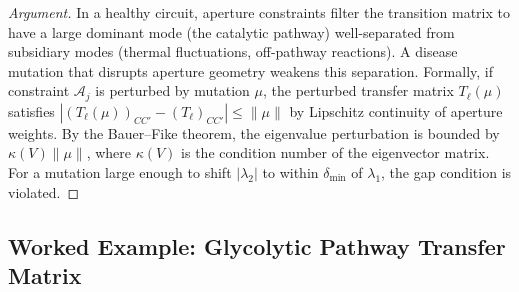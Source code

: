 \begin{proof}[Argument]
In a healthy circuit, aperture constraints filter the transition matrix to
have a large dominant mode (the catalytic pathway) well-separated from
subsidiary modes (thermal fluctuations, off-pathway reactions).  A disease
mutation that disrupts aperture geometry weakens this separation.  Formally,
if constraint $\mathcal{A}_j$ is perturbed by mutation $\mu$, the perturbed
transfer matrix $T_\ell(\mu)$ satisfies
$|(T_\ell(\mu))_{CC'} - (T_\ell)_{CC'}| \leq \|\mu\|$
by Lipschitz continuity of aperture weights.  By the Bauer--Fike theorem,
the eigenvalue perturbation is bounded by $\kappa(V)\|\mu\|$, where
$\kappa(V)$ is the condition number of the eigenvector matrix.  For a
mutation large enough to shift $|\lambda_2|$ to within $\delta_{\min}$ of
$\lambda_1$, the gap condition is violated.
\end{proof}

\subsection{Worked Example: Glycolytic Pathway Transfer Matrix}


